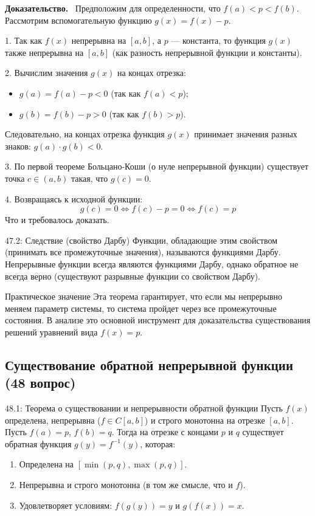 \documentclass[a4paper,12pt]{article}
\newcommand{\myproof}{\textbf{Доказательство.}\ }
\begin{document}
	
	\myproof
	Предположим для определенности, что $f(a) < p < f(b)$. 
	Рассмотрим вспомогательную функцию $g(x) = f(x) - p$.
	
	1. Так как $f(x)$ непрерывна на $[a, b]$, а $p$ — константа, то функция $g(x)$ также непрерывна на $[a, b]$ (как разность непрерывной функции и константы).
	
	2. Вычислим значения $g(x)$ на концах отрезка:
	\begin{itemize}
		\item $g(a) = f(a) - p < 0$ (так как $f(a) < p$);
		\item $g(b) = f(b) - p > 0$ (так как $f(b) > p$).
	\end{itemize}
	Следовательно, на концах отрезка функция $g(x)$ принимает значения разных знаков: $g(a) \cdot g(b) < 0$.
	
	3. По первой теореме Больцано-Коши (о нуле непрерывной функции) существует точка $c \in (a, b)$ такая, что $g(c) = 0$.
	
	4. Возвращаясь к исходной функции:
	$$ g(c) = 0 \iff f(c) - p = 0 \iff f(c) = p $$
	Что и требовалось доказать.
	
	\begin{notebook}{47.2: Следствие (свойство Дарбу)}
		Функции, обладающие этим свойством (принимать все промежуточные значения), называются функциями Дарбу. Непрерывные функции всегда являются функциями Дарбу, однако обратное не всегда верно (существуют разрывные функции со свойством Дарбу).
	\end{notebook}
	
	\begin{importantbox}{Практическое значение}
		Эта теорема гарантирует, что если мы непрерывно меняем параметр системы, то система пройдет через все промежуточные состояния. В анализе это основной инструмент для доказательства существования решений уравнений вида $f(x) = p$.
	\end{importantbox}
	
	
	
	
	
	

	\newpage
	\subsection{Существование обратной непрерывной функции (48 вопрос)}
	
	\begin{theorembox}{48.1: Теорема о существовании и непрерывности обратной функции}
		Пусть $f(x)$ определена, непрерывна ($f \in C[a, b]$) и строго монотонна на отрезке $[a, b]$. Пусть $f(a) = p$, $f(b) = q$.
		Тогда на отрезке с концами $p$ и $q$ существует обратная функция $g(y) = f^{-1}(y)$, которая:
		\begin{enumerate}
			\item Определена на $[\min(p, q), \max(p, q)]$.
			\item Непрерывна и строго монотонна (в том же смысле, что и $f$).
			\item Удовлетворяет условиям: $f(g(y)) = y$ и $g(f(x)) = x$.
		\end{enumerate}
	\end{theorembox}
		
\end{document}
